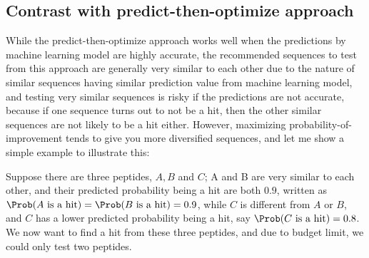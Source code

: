 \subsection{Contrast with predict-then-optimize approach} \label{sec:contrast with predict-then-optimize}
While the predict-then-optimize approach works well when the predictions by machine learning model are highly accurate, the recommended sequences to test from this approach are generally very similar to each other due to the nature of similar sequences having similar prediction value from machine learning model, and testing very similar sequences is risky if the predictions are not accurate, because if one sequence turns out to not be a hit, then the other similar sequences are not likely to be a hit either. However, maximizing probability-of-improvement tends to give you more diversified sequences, and let me show a simple example to illustrate this:

Suppose there are three peptides, $A, B$ and $C$; A and B are very similar to each other, 
and their predicted probability being a hit are both $0.9$, written as $\Prob (A \text{ is a hit}) = \Prob (B \text{ is a hit}) = 0.9$, 
while $C$ is different from $A$ or $B$, and $C$ has a lower predicted probability being a hit, say $\Prob (C \text{ is a hit}) = 0.8$.
We now want to find a hit from these three peptides, and due to budget limit, we could only test two peptides.

